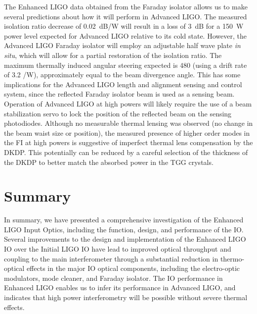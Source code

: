 The Enhanced LIGO data obtained from the Faraday isolator allows us to
make several predictions about how it will perform in Advanced LIGO.
The measured isolation ratio decrease of 0.02~dB/W will result in a
loss of 3~dB for a 150~W power level expected for Advanced LIGO
relative to its cold state.  However, the Advanced LIGO Faraday
isolator will employ an adjustable half wave plate \emph{in situ},
which will allow for a partial restoration of the isolation ratio. The
maximum thermally induced angular steering expected is 480 \microrad
(using a drift rate of 3.2 \microrad/W), approximately equal to the
beam divergence angle. This has some implications for the Advanced
LIGO length and alignment sensing and control system, since the
reflected Faraday isolator beam is used as a sensing beam. Operation
of Advanced LIGO at high powers will likely require the use of a beam
stabilization servo to lock the position of the reflected beam on the
sensing photodiodes.  Although no measurable thermal lensing was
observed (no change in the beam waist size or position), the measured
presence of higher order modes in the FI at high powers is suggestive
of imperfect thermal lens compensation by the DKDP.  This potentially
can be reduced by a careful selection of the thickness of the DKDP to
better match the absorbed power in the TGG crystals.

\section{Summary}
\label{sec:summary}
In summary, we have presented a comprehensive investigation of the
Enhanced LIGO Input Optics, including the function, design, and
performance of the IO.  Several improvements to the design and
implementation of the Enhanced LIGO IO over the Initial LIGO IO have
lead to improved optical throughput and coupling to the main
interferometer through a substantial reduction in thermo-optical
effects in the major IO optical components, including the
electro-optic modulators, mode cleaner, and Faraday isolator.  The IO
performance in Enhanced LIGO enables us to infer its performance in
Advanced LIGO, and indicates that high power interferometry will be
possible without severe thermal effects.


